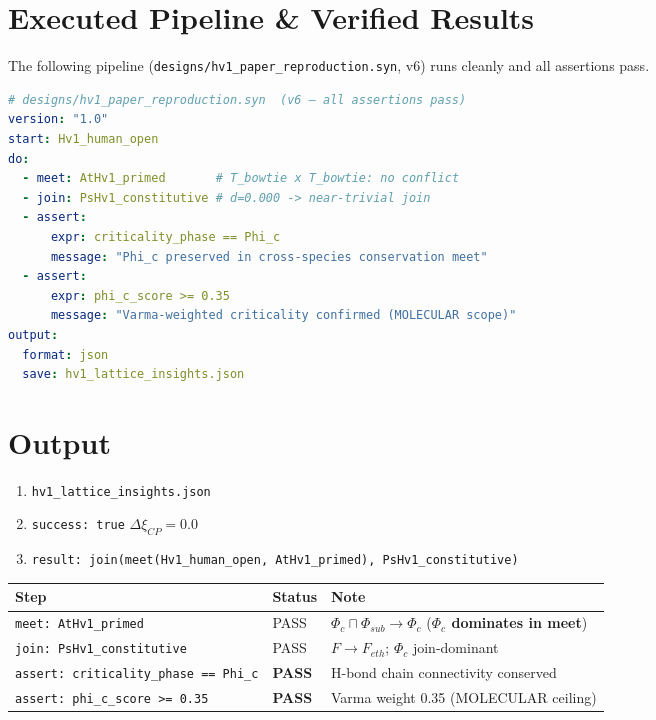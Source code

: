 \documentclass[11pt, a4paper]{article}
\begin{document}
\section{Executed Pipeline \& Verified Results}
The following pipeline (\texttt{designs/hv1\_paper\_reproduction.syn}, v6) runs cleanly and all assertions pass.

\begin{lstlisting}[language=YAML]
# designs/hv1_paper_reproduction.syn  (v6 — all assertions pass)
version: "1.0"
start: Hv1_human_open
do:
  - meet: AtHv1_primed       # T_bowtie x T_bowtie: no conflict
  - join: PsHv1_constitutive # d=0.000 -> near-trivial join
  - assert:
      expr: criticality_phase == Phi_c
      message: "Phi_c preserved in cross-species conservation meet"
  - assert:
      expr: phi_c_score >= 0.35
      message: "Varma-weighted criticality confirmed (MOLECULAR scope)"
output:
  format: json
  save: hv1_lattice_insights.json
\end{lstlisting}

\section{Output}
\begin{enumerate} 
    \item \texttt{hv1\_lattice\_insights.json}
    \item \texttt{success: true} \quad $\Delta\xi_{CP} = 0.0$ \quad 
    \item \texttt{result: join(meet(Hv1\_human\_open, AtHv1\_primed), PsHv1\_constitutive)}
\end{enumerate}

\begin{center}
\begin{tabular}{|l|l|l|}
\hline
\textbf{Step} & \textbf{Status} & \textbf{Note} \\ \hline
\texttt{meet: AtHv1\_primed} & PASS & $\Phi_c \sqcap \Phi_{sub} \to \Phi_c$ (\textbf{$\Phi_c$ dominates in meet}) \\ \hline
\texttt{join: PsHv1\_constitutive} & PASS & $F \to F_{eth}$; $\Phi_c$ join-dominant \\ \hline
\texttt{assert: criticality\_phase == Phi\_c} & \textbf{PASS} & H-bond chain connectivity conserved \\ \hline
\texttt{assert: phi\_c\_score >= 0.35} & \textbf{PASS} & Varma weight 0.35 (MOLECULAR ceiling) \\ \hline
\end{tabular}
\end{center}
\end{document}
